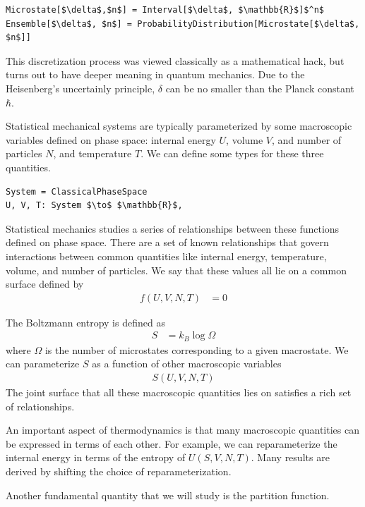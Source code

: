 \documentclass[book.tex]{subfiles}
\begin{document}
\begin{lstlisting}
Microstate[$\delta$,$n$] = Interval[$\delta$, $\mathbb{R}$]$^n$
Ensemble[$\delta$, $n$] = ProbabilityDistribution[Microstate[$\delta$, $n$]]
\end{lstlisting}

This discretization process was viewed classically as a mathematical hack, but turns out to have deeper meaning in quantum mechanics. Due to the Heisenberg's uncertainly principle, $\delta$ can be no smaller than the Planck constant $\hbar$.

Statistical mechanical systems are typically parameterized by some macroscopic variables defined on phase space: internal energy $U$, volume $V$, and number of particles $N$, and temperature $T$. We can define some types for these three quantities.

\begin{lstlisting}
System = ClassicalPhaseSpace
U, V, T: System $\to$ $\mathbb{R}$, 
\end{lstlisting}

Statistical mechanics studies a series of relationships between these functions defined on phase space. There are a set of known relationships that govern interactions between common quantities like internal energy, temperature, volume, and number of particles. We say that these values all lie on a common surface defined by
\begin{align}
    f(U, V, N, T) &= 0
\end{align}

The Boltzmann entropy is defined as 
\begin{align}
    S &= k_B \log \Omega
\end{align}
where $\Omega$ is the number of microstates corresponding to a given macrostate. We can parameterize $S$ as a function of other macroscopic variables 
\begin{align}
S(U, V, N, T)
\end{align} 
The joint surface that all these macroscopic quantities lies on satisfies a rich set of relationships.

An important aspect of thermodynamics is that many macroscopic quantities can be expressed in terms of each other. For example, we can reparameterize the internal energy in terms of the entropy of $U(S, V, N, T)$. Many results are derived by shifting the choice of reparameterization.

Another fundamental quantity that we will study is the partition function. 
\end{document}
